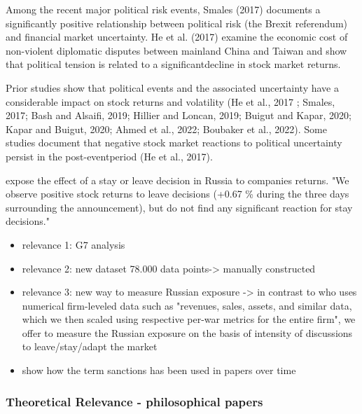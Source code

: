 \documentclass[12pt,a4paper]{article}
\begin{document}
Among the recent major political risk events, Smales (2017) documents a significantly positive relationship between political risk (the Brexit referendum) and financial market uncertainty. He et al. (2017) examine the economic cost of non-violent diplomatic disputes between mainland China and Taiwan and show that political tension is related to a significantdecline in stock market returns. \citep{kamal_impact_2023}

Prior studies show that political events and the associated uncertainty have a considerable impact on stock returns and volatility (He et al., 2017 ; Smales, 2017; Bash and Alsaifi, 2019; Hillier and Loncan, 2019; Buigut and Kapar, 2020; Kapar and Buigut, 2020; Ahmed et al., 2022; Boubaker et al., 2022). Some studies document that negative stock market reactions to political uncertainty persist in the post-eventperiod (He et al., 2017). \citep[p. ~4]{kamal_impact_2023}

\citep{kiesel_should_2023} expose the effect of a stay or leave decision in Russia to companies returns. "We observe positive stock returns to leave decisions (+0.67 \% during the three days surrounding the announcement), but do not find any significant reaction for stay decisions." 


\begin{itemize}
  \item relevance 1: G7 analysis 
  \item relevance 2: new dataset 78.000 data points-> manually constructed
  \item relevance 3: new way to measure Russian exposure -> in contrast to \citet{balyuk_divesting_2023} who uses numerical firm-leveled data such as "revenues, sales, assets, and similar data, which we then scaled using respective per-war metrics for the entire firm", we offer to measure the Russian exposure on the basis of intensity of discussions to leave/stay/adapt the market 
  \item show how the term sanctions has been used in papers over time 
\end{itemize}



\subsubsection{Theoretical Relevance - philosophical papers}
\label{subchap:intro_relevance_theoretical}
\end{document}
